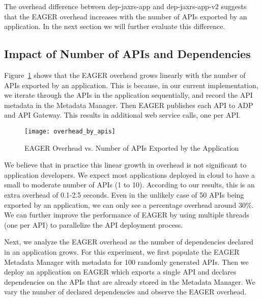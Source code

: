 The overhead difference between dep-jaxrs-app and dep-jaxrs-app-v2 suggests that the EAGER overhead increases with the number
of APIs exported by an application. In the next section we will further evaluate this difference.

\subsection{Impact of Number of APIs and Dependencies}

Figure~\ref{fig:overhead_by_apis} shows that the EAGER overhead grows linearly with the number of APIs exported by an application.
This is because, in our current implementation, we iterate through the APIs in the application sequentially, and record the API metadata in the
Metadata Manager. Then EAGER publishes each API to ADP and API Gateway. This results in 
additional web service calls, one per API. %

\begin{figure}
\centering
\texttt{[image: overhead\_by\_apis]}
\caption{EAGER Overhead vs. Number of APIs Exported by the Application}
\label{fig:overhead_by_apis}
\end{figure}

We believe that in practice this linear growth in overhead is not significant to application developers.
We expect most applications deployed in cloud to have a small to moderate number of APIs (1 to 10). According to our results, this is an 
extra overhead of 0.1-2.5 seconds. Even in the
unlikely case of 50 APIs being exported by an application, we can only see a percentage overhead around 30\%. 
We can further improve the performance of EAGER by using multiple threads (one per API) to parallelize the API deployment process. %

Next, we analyze the EAGER overhead as the number of dependencies declared in an application grows. For this experiment, we first populate 
the EAGER Metadata Manager with metadata for 100 randomly generated APIs. Then we deploy an application on EAGER which exports a single
API and declares dependencies on the APIs that are already stored in the Metadata Manager. We vary the number of declared dependencies and
observe the EAGER overhead.

